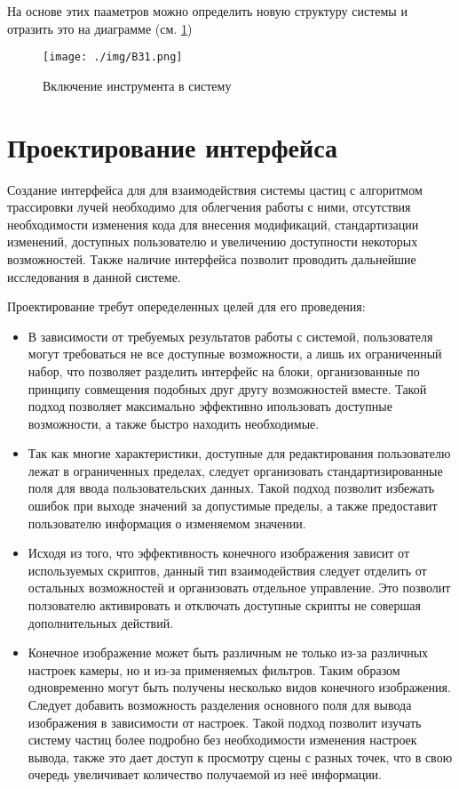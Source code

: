 На основе этих пааметров можно определить новую структуру системы и отразить это на диаграмме (см. \ref{pic:B31})

\begin{figure} 
\begin{center}
\texttt{[image: ./img/B31.png]}
\end{center}
\caption{Включение инструмента в систему}
\label{pic:B31}
\end{figure}

\section{Проектирование интерфейса}


Создание интерфейса для для взаимодействия системы цастиц с алгоритмом трассировки лучей необходимо для облегчения работы с ними, отсутствия необходимости изменения кода для внесения модификаций, стандартизации изменений, доступных пользователю и увеличению доступности некоторых возможностей. Также наличие интерфейса позволит проводить дальнейшие исследования в данной системе. 

Проектирование требут опеределенных целей для его проведения:

\begin{itemize}
	\item В зависимости от требуемых результатов работы с системой, пользователя могут требоваться не все доступные возможности, а лишь их ограниченный набор, что позволяет разделить интерфейс на блоки, организованные по принципу совмещения подобных друг другу возможностей вместе. Такой подход позволяет максимально эффективно ипользовать доступные возможности, а также быстро находить необходимые.
	\item Так как многие характеристики, доступные для редактирования пользователю лежат в ограниченных пределах, следует организовать стандартизированные поля для ввода пользовательских данных. Такой подход позволит избежать ошибок при выходе значений за допустимые пределы, а также предоставит пользователю информация о изменяемом значении.
	\item Исходя из того, что эффективность конечного изображения зависит от используемых скриптов, данный тип взаимодействия следует отделить от остальных возможностей и организовать отдельное управление. Это позволит ползователю активировать и отключать доступные скрипты не совершая дополнительных действий.
	\item Конечное изображение может быть различным не только из-за различных настроек камеры, но и из-за применяемых фильтров. Таким образом одновременно могут быть получены несколько видов конечного изображения. Следует добавить возможность разделения основного поля для вывода изображения в зависимости от настроек. Такой подход позволит изучать систему частиц более подробно без необходимости изменения настроек вывода, также это дает доступ к просмотру сцены с разных точек, что в свою очередь увеличивает количество получаемой из неё информации.
\end{itemize}

